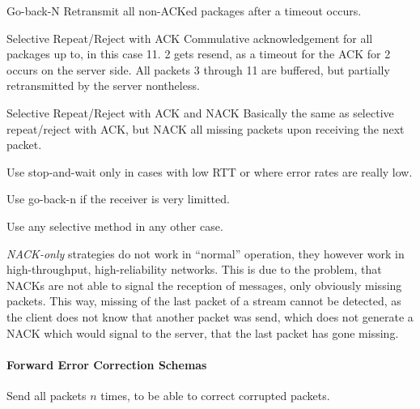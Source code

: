 \documentclass[english]{panikzettel}
\begin{document}
	\begin{thirdboxl}
		\vspace{-\baselineskip}
		\begin{defi}{Go-back-N}
			Retransmit all non-ACKed packages after a timeout occurs.
		\end{defi}
	\end{thirdboxl}
	\begin{thirdboxm}
		\vspace{-\baselineskip}
		\begin{defi}{Selective Repeat/Reject with ACK}
			Commulative acknowledgement for all packages up to, in this case 11. 2 gets resend, as a timeout for the ACK for 2 occurs on the server side. All packets 3 through 11 are buffered, but partially retransmitted by the server nontheless.
		\end{defi}
	\end{thirdboxm}
	\begin{thirdboxr}
		\vspace{-\baselineskip}
		\begin{defi}{Selective Repeat/Reject with ACK and NACK}
			Basically the same as selective repeat/reject with ACK, but NACK all missing packets upon receiving the next packet.
		\end{defi}
	\end{thirdboxr}

	Use stop-and-wait only in cases with low RTT or where error rates are really low.

	Use go-back-n if the receiver is very limitted.

	Use any selective method in any other case.

	\textit{NACK-only} strategies do not work in \enquote{normal} operation, they however work in high-throughput, high-reliability networks. 
	This is due to the problem, that NACKs are not able to signal the reception of messages, only obviously missing packets.
	This way, missing of the last packet of a stream cannot be detected, as the client does not know that another packet was send, which does not generate a NACK which would signal to the server, that the last packet has gone missing.

	\paragraph{Forward Error Correction Schemas}
	\label{pgf-forward-error-correction-schemas}
	
	Send all packets \( n \) times, to be able to correct corrupted packets. 
\end{document}

